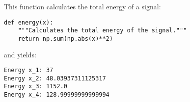 
\item[(e)]
This function calculates the total energy of a signal:

\begin{verbatim}
def energy(x):
    """Calculates the total energy of the signal."""
    return np.sum(np.abs(x)**2)
\end{verbatim}

and yields:
\begin{verbatim}
Energy x_1: 37
Energy x_2: 48.03937311125317
Energy x_3: 1152.0
Energy x_4: 128.99999999999994
\end{verbatim}
